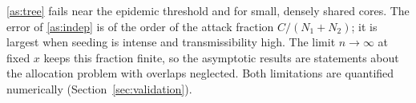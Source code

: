 \begin{remark}
\ref{as:tree} fails near the epidemic threshold and for small, densely shared
cores. The error of \ref{as:indep} is of the order of the attack fraction
$C/(N_1+N_2)$; it is largest when seeding is intense and transmissibility high.
The limit $n\to\infty$ at fixed $x$ keeps this fraction finite, so the asymptotic
results are statements about the allocation problem with overlaps neglected.
Both limitations are quantified numerically (Section~\ref{sec:validation}).
\end{remark}

